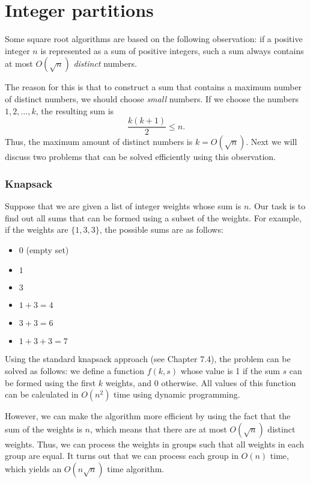 \section{Integer partitions}

Some square root algorithms are based on
the following observation:
if a positive integer $n$ is represented as
a sum of positive integers,
such a sum always contains at most
$O(\sqrt n)$ \emph{distinct} numbers.

The reason for this is that to construct
a sum that contains a maximum number of distinct
numbers, we should choose \emph{small} numbers.
If we choose the numbers $1,2,\ldots,k$,
the resulting sum is
\[\frac{k(k+1)}{2} \le n.\]
Thus, the maximum amount of distinct numbers is $k = O(\sqrt n)$.
Next we will discuss two problems that can be solved
efficiently using this observation.

\subsubsection{Knapsack}

Suppose that we are given a list of integer weights
whose sum is $n$.
Our task is to find out all sums that can be formed using
a subset of the weights. For example, if the weights are
$\{1,3,3\}$, the possible sums are as follows:

\begin{itemize}[noitemsep]
\item $0$ (empty set)
\item $1$
\item $3$
\item $1+3=4$
\item $3+3=6$
\item $1+3+3=7$
\end{itemize}

Using the standard knapsack approach (see Chapter 7.4),
the problem can be solved as follows:
we define a function $f(k,s)$ whose value is 1
if the sum $s$ can be formed using the first $k$ weights,
and 0 otherwise.
All values of this function can be calculated
in $O(n^2)$ time using dynamic programming.

However, we can make the algorithm more efficient
by using the fact that the sum of the weights is $n$,
which means that there are at most $O(\sqrt n)$
distinct weights.
Thus, we can process the weights in groups
such that all weights in each group are equal.
It turns out that we can process each group
in $O(n)$ time, which yields an $O(n \sqrt n)$ time algorithm.

